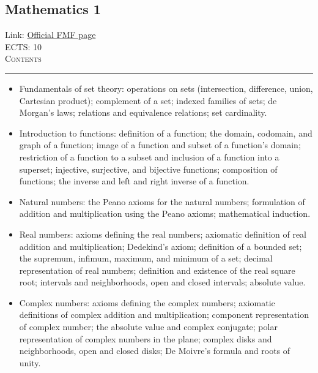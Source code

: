 \documentclass[11pt, a4paper]{article}
\newenvironment{course}[3]{
\subsection{#1}%
Link: \href{#2}{Official FMF page}\\%
ECTS: #3%
\vspace{1ex}
\\
{\large \textsc{Contents}}\\[-0.9ex]%
\rule{\textwidth}{0.5pt}
\vspace{-3ex}
}
{}
\newenvironment{chapter}[1]{
\begin{tcolorbox}[title=#1, breakable]
}
{\end{tcolorbox}}
\begin{document}
\begin{course}{Mathematics 1}{https://www.fmf.uni-lj.si/en/study-physics/programmes/1fiz/2020/7000777/courses/520/}{10}
    \label{mathematics-1}
    
    \begin{chapter}{Sets and functions}
        \begin{itemize}
        
            \item Fundamentals of set theory: operations on sets (intersection, difference, union, Cartesian product); complement of a set; indexed families of sets; de Morgan's laws; relations and equivalence relations; set cardinality.

            \item Introduction to functions: definition of a function; the domain, codomain, and graph of a function; image of a function and subset of a function's domain; restriction of a function to a subset and inclusion of a function into a superset; injective, surjective, and bijective functions; composition of functions; the inverse and left and right inverse of a function.
        
        \end{itemize}
    \end{chapter}

    \begin{chapter}{Numbers}
        \begin{itemize}
        
            \item Natural numbers: the Peano axioms for the natural numbers; formulation of addition and multiplication using the Peano axioms; mathematical induction. 

            \item Real numbers: axioms defining the real numbers; axiomatic definition of real addition and multiplication; Dedekind's axiom; definition of a bounded set; the supremum, infimum, maximum, and minimum of a set; decimal representation of real numbers; definition and existence of the real square root; intervals and neighborhoods, open and closed intervals; absolute value.

            \item Complex numbers: axioms defining the complex numbers; axiomatic definitions of complex addition and multiplication; component representation of complex number; the absolute value and complex conjugate; polar representation of complex numbers in the plane; complex disks and neighborhoods, open and closed disks; De Moivre's formula and roots of unity.
        

\end{itemize}
\end{chapter}
\end{course}
\end{document}
